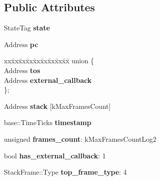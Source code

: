 \subsection*{Public Attributes}
\begin{DoxyCompactItemize}
\item 
\hypertarget{structv8_1_1internal_1_1_tick_sample_ad916ea9e1b1dd6c47309396e8153ef3f}{}State\+Tag {\bfseries state}\label{structv8_1_1internal_1_1_tick_sample_ad916ea9e1b1dd6c47309396e8153ef3f}

\item 
\hypertarget{structv8_1_1internal_1_1_tick_sample_a8c5549c8d314a97bcfa3900dffadc72f}{}Address {\bfseries pc}\label{structv8_1_1internal_1_1_tick_sample_a8c5549c8d314a97bcfa3900dffadc72f}

\item 
\hypertarget{structv8_1_1internal_1_1_tick_sample_a52781e4a429bca12a75d2a79ec928471}{}\begin{tabbing}
xx\=xx\=xx\=xx\=xx\=xx\=xx\=xx\=xx\=\kill
union \{\\
\>Address {\bfseries tos}\\
\>Address {\bfseries external\_callback}\\
\}; \label{structv8_1_1internal_1_1_tick_sample_a52781e4a429bca12a75d2a79ec928471}
\\

\end{tabbing}\item 
\hypertarget{structv8_1_1internal_1_1_tick_sample_a79ef09cd1d44de501069ec38e7a0700e}{}Address {\bfseries stack} \mbox{[}k\+Max\+Frames\+Count\mbox{]}\label{structv8_1_1internal_1_1_tick_sample_a79ef09cd1d44de501069ec38e7a0700e}

\item 
\hypertarget{structv8_1_1internal_1_1_tick_sample_a5955372cc02222b2db1fff8504ef45e5}{}base\+::\+Time\+Ticks {\bfseries timestamp}\label{structv8_1_1internal_1_1_tick_sample_a5955372cc02222b2db1fff8504ef45e5}

\item 
\hypertarget{structv8_1_1internal_1_1_tick_sample_ac7981f5af4beecbce4a3acee6eb7a442}{}unsigned {\bfseries frames\+\_\+count}\+: k\+Max\+Frames\+Count\+Log2\label{structv8_1_1internal_1_1_tick_sample_ac7981f5af4beecbce4a3acee6eb7a442}

\item 
\hypertarget{structv8_1_1internal_1_1_tick_sample_aab6f962edf414a9fc191ed879921b13d}{}bool {\bfseries has\+\_\+external\+\_\+callback}\+: 1\label{structv8_1_1internal_1_1_tick_sample_aab6f962edf414a9fc191ed879921b13d}

\item 
\hypertarget{structv8_1_1internal_1_1_tick_sample_a3be24a623a54a910808059ea4af16de7}{}Stack\+Frame\+::\+Type {\bfseries top\+\_\+frame\+\_\+type}\+: 4\label{structv8_1_1internal_1_1_tick_sample_a3be24a623a54a910808059ea4af16de7}

\end{DoxyCompactItemize}

